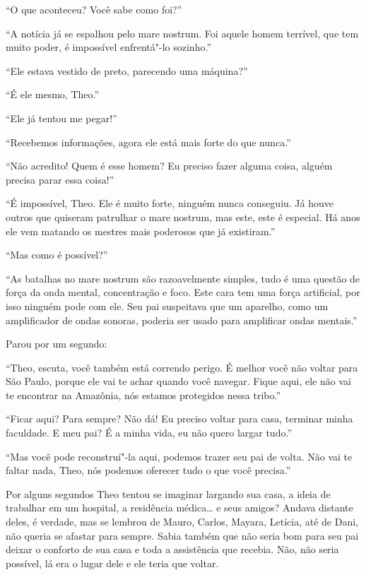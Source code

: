 ``O que aconteceu? Você sabe como foi?''

``A notícia já se espalhou pelo mare nostrum. Foi aquele homem terrível,
que tem muito poder, é impossível enfrentá"-lo sozinho.''

``Ele estava vestido de preto, parecendo uma máquina?''

``É ele mesmo, Theo.''

``Ele já tentou me pegar!''

``Recebemos informações, agora ele está mais
forte do que nunca.''

``Não acredito! Quem é esse homem? Eu preciso fazer alguma coisa, alguém
precisa parar essa coisa!''

``É impossível, Theo. Ele é muito forte, ninguém nunca conseguiu. Já
houve outros que quiseram patrulhar o mare nostrum, mas este, este é
especial. Há anos ele vem matando os mestres mais poderosos que já
existiram.''

``Mas como é possível?''

``As batalhas no mare nostrum são razoavelmente simples, tudo é uma
questão de força da onda mental, concentração e foco. Este cara tem uma
força artificial, por isso ninguém pode com ele. Seu pai suspeitava que
um aparelho, como um amplificador de ondas sonoras, poderia ser usado para amplificar ondas
mentais.''

Parou por um segundo:

``Theo, escuta, você também está correndo perigo. É
melhor você não voltar para São Paulo, porque ele vai te achar quando
você navegar. Fique aqui, ele não vai te encontrar na Amazônia, nós
estamos protegidos nessa tribo.''

``Ficar aqui? Para sempre? Não dá! Eu preciso voltar para casa, terminar
minha faculdade. E meu pai? É a minha vida, eu não quero largar tudo.''

``Mas você pode reconstruí"-la aqui, podemos trazer seu pai de volta. Não
vai te faltar nada, Theo, nós podemos oferecer tudo o que você
precisa.''

Por alguns segundos Theo tentou se imaginar largando sua casa, a ideia de trabalhar
em um hospital, a residência médica\ldots{} e seus amigos? Andava distante
deles, é verdade, mas se lembrou de Mauro, Carlos, Mayara, Letícia, até
de Dani, não queria se afastar para sempre. Sabia também que não seria
bom para seu pai deixar o conforto de sua casa e toda a assistência que
recebia. Não, não seria possível, lá era o lugar dele e ele teria que
voltar.

